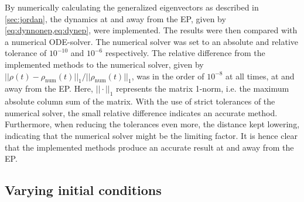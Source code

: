 \documentclass[../main.tex]{subfiles}
\begin{document}
By numerically calculating the generalized eigenvectors as described in \cref{sec:jordan}, the dynamics at and away from the EP, given by \cref{eq:dynnonep,eq:dynep}, were implemented. The results were then compared with a numerical ODE-solver. The numerical solver was set to an absolute and relative tolerance of $10^{-10}$ and $10^{-6}$ respectively. The relative difference from the implemented methods to the numerical solver, given by $||\rho(t) - \rho_\text{num}(t)||_1/||\rho_\text{num}(t)||_1$, was in the order of $10^{-8}$ at all times, at and away from the EP. Here, $||\cdot||_1$ represents the matrix 1-norm, i.e. the maximum absolute column sum of the matrix. With the use of strict tolerances of the numerical solver, the small relative difference indicates an accurate method. Furthermore, when reducing the tolerances even more, the distance kept lowering, indicating that the numerical solver might be the limiting factor. It is hence clear that the implemented methods produce an accurate result at and away from the EP. 



\subsection{Varying initial conditions}
\end{document}
